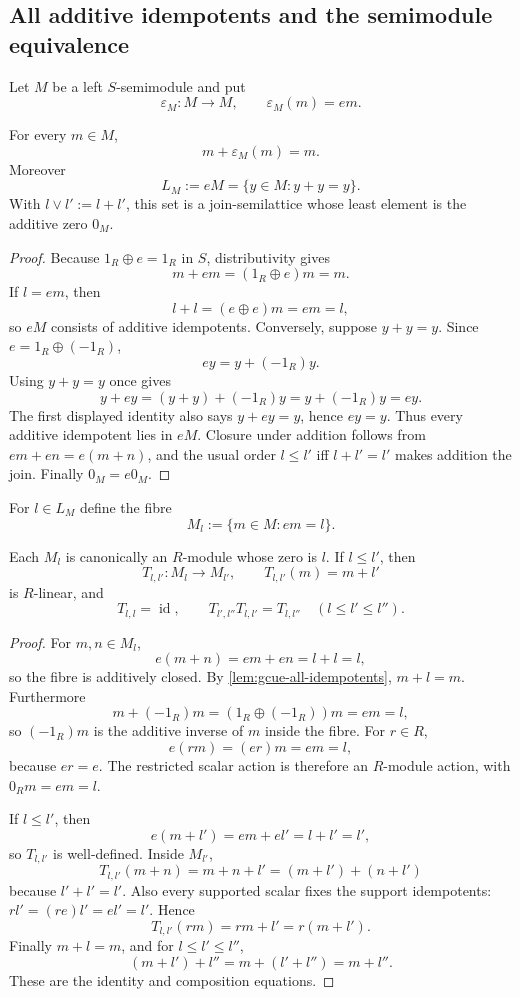 \subsection{All additive idempotents and the semimodule equivalence}

Let $M$ be a left $S$-semimodule and put
\[
 \varepsilon_M:M\to M,\qquad \varepsilon_M(m)=em.
\]

\begin{lemma}
\label{lem:gcue-all-idempotents}
For every $m\in M$,
\[
 m+\varepsilon_M(m)=m.
\]
Moreover
\[
 L_M:=eM=\{y\in M:y+y=y\}.
\]
With $l\vee l':=l+l'$, this set is a join-semilattice whose least element is the additive
zero $0_M$.
\end{lemma}

\begin{proof}
Because $1_R\oplus e=1_R$ in $S$, distributivity gives
\[
 m+em=(1_R\oplus e)m=m.
\]
If $l=em$, then
\[
 l+l=(e\oplus e)m=em=l,
\]
so $eM$ consists of additive idempotents.  Conversely, suppose $y+y=y$.  Since
$e=1_R\oplus(-1_R)$,
\[
 ey=y+(-1_R)y.
\]
Using $y+y=y$ once gives
\[
 y+ey=(y+y)+(-1_R)y=y+(-1_R)y=ey.
\]
The first displayed identity also says $y+ey=y$, hence $ey=y$.  Thus every additive
idempotent lies in $eM$.  Closure under addition follows from
$em+en=e(m+n)$, and the usual order $l\le l'$ iff $l+l'=l'$ makes addition the join.
Finally $0_M=e0_M$.
\end{proof}

For $l\in L_M$ define the fibre
\[
 M_l:=\{m\in M:em=l\}.
\]

\begin{lemma}
\label{lem:gcue-fibre-modules}
Each $M_l$ is canonically an $R$-module whose zero is $l$.  If $l\le l'$, then
\[
 T_{l,l'}:M_l\to M_{l'},\qquad T_{l,l'}(m)=m+l'
\]
is $R$-linear, and
\[
 T_{l,l}=\operatorname{id},\qquad
 T_{l',l''}T_{l,l'}=T_{l,l''}\quad(l\le l'\le l'').
\]
\end{lemma}

\begin{proof}
For $m,n\in M_l$,
\[
 e(m+n)=em+en=l+l=l,
\]
so the fibre is additively closed.  By \cref{lem:gcue-all-idempotents}, $m+l=m$.
Furthermore
\[
 m+(-1_R)m=(1_R\oplus(-1_R))m=em=l,
\]
so $(-1_R)m$ is the additive inverse of $m$ inside the fibre.  For $r\in R$,
\[
 e(rm)=(er)m=em=l,
\]
because $er=e$.  The restricted scalar action is therefore an $R$-module action, with
$0_Rm=em=l$.

If $l\le l'$, then
\[
 e(m+l')=em+el'=l+l'=l',
\]
so $T_{l,l'}$ is well-defined.  Inside $M_{l'}$,
\[
 T_{l,l'}(m+n)=m+n+l'=(m+l')+(n+l')
\]
because $l'+l'=l'$.  Also every supported scalar fixes the support idempotents:
$rl'=(re)l'=el'=l'$.  Hence
\[
 T_{l,l'}(rm)=rm+l'=r(m+l').
\]
Finally $m+l=m$, and for $l\le l'\le l''$,
\[
 (m+l')+l''=m+(l'+l'')=m+l''.
\]
These are the identity and composition equations.
\end{proof}

